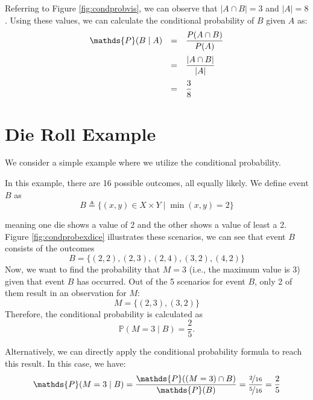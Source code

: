 

Referring to Figure \ref{fig:condprobvis}, we can observe that $|A\cap B|= 3$ and $|A| = 8$. Using these values, we can calculate the conditional probability of $B$ given $A$ as:
\[
\begin{array}{ccl}
\mathds{P}(B \mid A) &=& \dis\frac{P(A \cap B)}{P(A)} \\[0.4cm]
&=& \dis\frac{|A \cap B|}{|A|}\\[0.4cm]
&=& \dis\frac{3}{8}
\end{array}
\]

\clearpage 
\section{Die Roll Example}
We consider a simple example where we utilize the conditional probability.

In this example, there are 16 possible outcomes, all equally likely. We define event $B$ as 
\[
B \triangleq \{(x, y)\in X\times Y \mid \min(x, y) = 2\}
\]

meaning one die shows a value of 2 and the other shows a value of least a 2. Figure \cref{fig:condprobexdice} illustrates these scenarios, we can see that event $B$ consists of the outcomes 
\[
B=\{(2,2), (2,3), (2,4), (3,2), (4,2)\}
\] 
Now, we want to find the probability that $M=3$ (i.e., the maximum value is 3) given that event $B$ has occurred. Out of the 5 scenarios for event $B$, only 2 of them result in an observation for $M$:
\[
M=\{(2,3), (3,2)\}
\]
Therefore, the conditional probability is calculated as
\[
\mathds{P}(M=3 \mid B) = \frac{2}{5}.
\]

Alternatively, we can directly apply the conditional probability formula to reach this result. In this case, we have:
\[
\mathds{P}(M=3\mid B)=\frac{\mathds{P}((M=3)\cap B)}{\mathds{P}(B)}=\frac{\nicefrac{2}{16}}{\nicefrac{5}{16}}=\frac{2}{5}
\]

